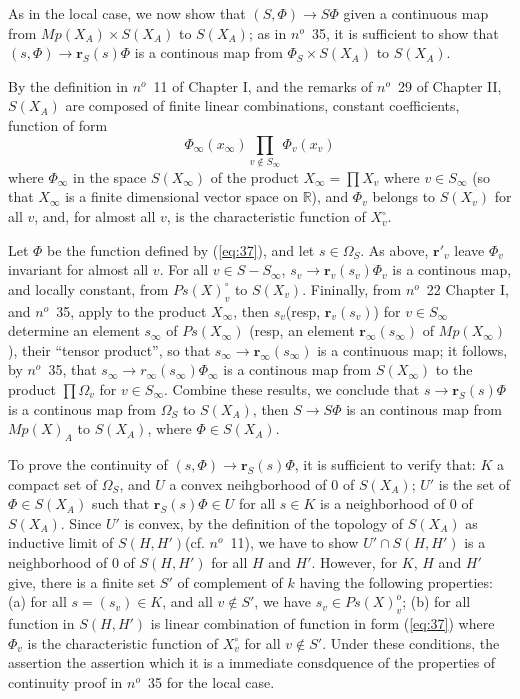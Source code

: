 \documentclass[12pt]{amsart}
\def\bR{{\mathbb{R}}}
\def\br{{\mathbf{r}}}
\newcounter{ssection}
\renewcommand{\subsection}{
  \addtocounter{ssection}{1}{\bf  \arabic{ssection}.\  }}
\begin{document}
\subsection{}
As in the local case, we now show that $(S, \Phi)\to S\Phi$ given 
a continuous map from $Mp(X_A)\times S(X_A)$ to $S(X_A)$;
as in $n^o$~35, it is sufficient to show that $(s,\Phi) \to \br_S(s) \Phi$ 
is a continous map from $\Phi_S\times S(X_A)$ to $S(X_A)$. 

By the definition in $n^o$~11 of Chapter I, and the remarks of $n^o$~29 of 
Chapter II, $S(X_A)$ are composed of finite linear combinations,
 constant coefficients, function of form
\begin{equation}\label{eq:37}
\Phi_\infty(x_\infty) \prod_{v\notin S_\infty}\Phi_v(x_v)
\end{equation} 
where $\Phi_\infty$ in the space $S(X_\infty)$ of the product $X_\infty =\prod X_v$
where $v\in S_\infty$ (so that $X_\infty$ is a finite dimensional 
vector space on $\bR$), and  $\Phi_v$ belongs to  $S(X_v)$ for all $v$,
and, for almost all $v$, is the characteristic function of $X_v^\circ$.

Let $\Phi$ be the function defined by (\ref{eq:37}), and let $s\in \Omega_S$. 
As above, $\br'_v$ leave $\Phi_v$ invariant for almost all $v$. 
For all $v\in S-S_\infty$, $s_v\to \br_v(s_v)\Phi_v$ is a continous map, 
and locally constant, from $Ps(X)_v^\circ$ to $S(X_v)$. 
Fininally, from $n^o$~22 Chapter I, and $n^o$~35, 
apply to the product $X_\infty$, then $s_v$(resp, $\br_v(s_v)$) 
for $v\in S_\infty$ determine an element $s_\infty$ of $Ps(X_\infty)$
(resp, an element $\br_\infty(s_\infty)$ of $Mp(X_\infty)$),
 their ``tensor product'', so that $s_\infty \to \br_\infty(s_\infty)$ is a 
continuous map; it follows, by $n^o$~35, 
that $s_\infty \to r_\infty(s_\infty)\Phi_\infty$ is a continous map from $S(X_\infty)$
to the product $\prod \Omega_v$ for $v\in S_\infty$. 
Combine these results, we conclude that $s\to \br_S(s)\Phi$ is a continous map 
from $\Omega_S$ to $S(X_A)$, then $S\to S\Phi$ is an continous map from
$Mp(X)_A$ to $S(X_A)$, where $\Phi \in S(X_A)$.
	
To prove the continuity of $(s, \Phi)\to \br_S(s)\Phi$, it is sufficient 
to verify  that: $K$ a compact set of $\Omega_S$, and $U$ 
a convex neihgborhood of $0$ of $S(X_A)$; $U'$ is the set 
of $\Phi\in S(X_A)$ such that $\br_S(s)\Phi\in U$ for all $s\in K$ is a
 neighborhood of $0$ of $S(X_A)$. Since $U'$ is convex, 
by the definition of the topology of $S(X_A)$ as inductive limit of 
$S(H,H')$(cf. $n^o$~11), we have to show $U'\cap S(H,H')$ is a neighborhood of 
$0$ of $S(H,H')$ for all $H$ and $H'$. 
However, for $K$, $H$ and $H'$ give, there is a finite set $S'$ of complement 
of $k$ having the following properties: (a) for all $s=(s_v)\in K$, and all 
$v\notin S'$, we have $s_v\in Ps(X)_v^o$; (b) for all function in $S(H,H')$
is linear combination of function in form (\ref{eq:37}) where $\Phi_v$ 
is the characteristic function of $X_v^\circ$ for all $v\notin S'$. 
Under these conditions, the assertion the assertion which it is a
immediate consdquence of the properties of continuity proof in $n^o$~35 
for the local case.
\end{document}
